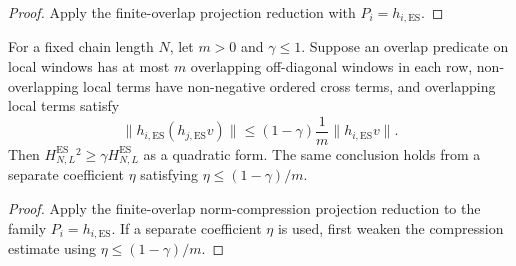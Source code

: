 \begin{proof}
    \leanok
    Apply the finite-overlap projection reduction with
    $P_i=h_{i,\mathrm{ES}}$.
\end{proof}

\begin{lemma}
    \label{lem:parent_hamiltonian_finite_overlap_norm_quadratic}
    \leanok
    For a fixed chain length $N$, let $m>0$ and $\gamma\le1$. Suppose an overlap
    predicate on local windows has at most $m$ overlapping off-diagonal windows in
    each row, non-overlapping local terms have non-negative ordered cross terms,
    and overlapping local terms satisfy
    \[
        \|h_{i,\mathrm{ES}}(h_{j,\mathrm{ES}}v)\|
        \le (1-\gamma)\frac{1}{m}\|h_{i,\mathrm{ES}}v\|.
    \]
    Then $H_{N,L}^{\mathrm{ES}}{}^2\ge \gamma H_{N,L}^{\mathrm{ES}}$ as a
    quadratic form. The same conclusion holds from a separate coefficient $\eta$
    satisfying $\eta\le(1-\gamma)/m$.
\end{lemma}

\begin{proof}
    \leanok
    Apply the finite-overlap norm-compression projection reduction to the family
    $P_i=h_{i,\mathrm{ES}}$. If a separate coefficient $\eta$ is used, first weaken
    the compression estimate using $\eta\le(1-\gamma)/m$.
\end{proof}
